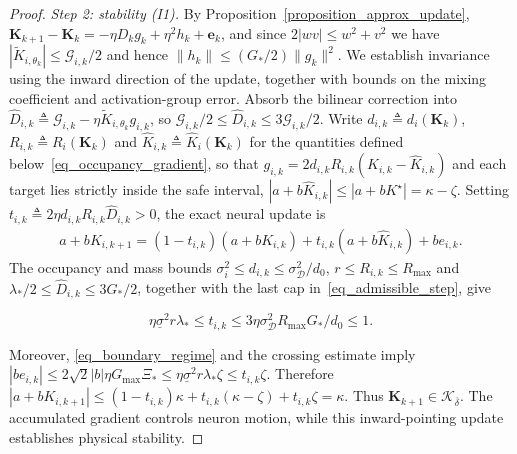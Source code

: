 \documentclass[letterpaper, 10 pt, conference]{ieeeconf}
\newcommand{\be}{\mathbf{e}}
\newcommand{\bK}{\mathbf{K}}
\newcommand{\cD}{\mathcal{D}}
\newcommand{\cG}{\mathcal{G}}
\newcommand{\cK}{\mathcal{K}}
\newcommand{\slo}{\underline{\sigma}}
\newcommand{\Prop}{Proposition}
\begin{document}
\begin{proof}
    \emph{Step 2: stability \textup{(I1)}.} By \Prop~\ref{proposition_approx_update},
    $\bK_{k+1}-\bK_k=-\eta D_kg_k+\eta^2h_k+\be_k$, and since $2|wv|\le w^2+v^2$ we have $|\widetilde K_{i,\theta_k}|\le\cG_{i,k}/2$ and hence $\|h_k\|\le(G_{\ast}/2)\|g_k\|^2$. We establish invariance using the inward direction of the update,
together with bounds on the mixing coefficient and activation-group error. Absorb the bilinear correction into
    $\widehat D_{i,k}\triangleq\cG_{i,k}-\eta\widetilde K_{i,\theta_k}g_{i,k}$, so
    $\cG_{i,k}/2\le\widehat D_{i,k}\le3\cG_{i,k}/2$.
    Write $d_{i,k}\triangleq d_i(\bK_k)$, $R_{i,k}\triangleq R_i(\bK_k)$ and $\widehat K_{i,k}\triangleq\widehat K_i(\bK_k)$ for the quantities defined below~\eqref{eq_occupancy_gradient}, so that $g_{i,k}=2d_{i,k}R_{i,k}(K_{i,k}-\widehat K_{i,k})$ and each target lies strictly inside the safe interval, $|a+b\widehat K_{i,k}|\le|a+bK^{\star}|=\kappa-\zeta$. Setting $t_{i,k}\triangleq2\eta d_{i,k}R_{i,k}\widehat D_{i,k}>0$, the exact neural update is
    \begin{equation}\label{eq_inward_update}
        \begin{aligned}
        a{+}bK_{i,k+1}{=}(1{-}t_{i,k})(a{+}bK_{i,k})
                     {+}t_{i,k}(a{+}b\widehat K_{i,k}){+}be_{i,k}.
        \end{aligned}
    \end{equation}
The occupancy and mass bounds $\sigma_i^2\le d_{i,k}\le\sigma_{\cD}^2/d_0$, $r\le R_{i,k}\le R_{\max}$ and $\lambda_{\ast}/2\le\widehat D_{i,k}\le3G_{\ast}/2$, together with the last cap in~\eqref{eq_admissible_step}, give

\vspace{-0.3cm}
    \begin{equation}
        \eta\slo^2r\lambda_{\ast}\le t_{i,k}
        \le{3\eta\sigma_{\cD}^2R_{\max}G_{\ast}}/{d_0}\le1.
    \end{equation}
\vspace{-0.5cm}
    
    Moreover, \eqref{eq_boundary_regime} and the crossing estimate imply
    $|be_{i,k}|\le2\sqrt2|b|\eta G_{\max}\Xi_{\ast}
       \le\eta\slo^2r\lambda_{\ast}\zeta\le t_{i,k}\zeta$.
    Therefore
    $|a+bK_{i,k+1}|\le(1-t_{i,k})\kappa+t_{i,k}(\kappa-\zeta)+t_{i,k}\zeta=\kappa$.
    Thus $\bK_{k+1}\in\cK_{\overline\delta}$. The accumulated gradient controls neuron motion, while this inward-pointing update establishes physical stability.


\end{proof}
\end{document}

